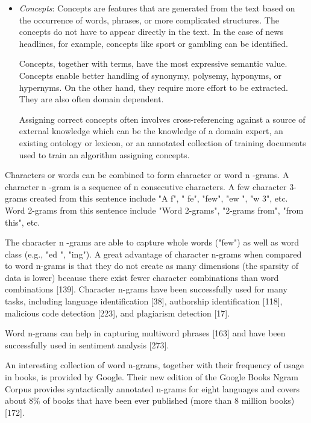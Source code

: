 \documentclass[11pt,openany,executivepaper]{book}
\begin{document}
\begin{itemize}
  Term extraction is related to the Named Entity Recognition (NER) problem, which is a subtask of Information Extraction. Its goal is to identify information units like names (typically persons, organizations, and location) and numeric expressions including time, date, money, and percent expressions [205].
  \bigskip
  
  \item \textit{Concepts}: Concepts are features that are generated from the text based on the occurrence of words, phrases, or more complicated structures. The concepts do not have to appear directly in the text. In the case of news headlines, for example, concepts like sport or gambling can be identified.
  \bigskip

  Concepts, together with terms, have the most expressive semantic value. Concepts enable better handling of synonymy, polysemy, hyponyms, or hypernyms. On the other hand, they require more effort to be extracted. They are also often domain dependent.
  \bigskip

  Assigning correct concepts often involves cross-referencing against a source of external knowledge which can be the knowledge of a domain expert, an existing ontology or lexicon, or an annotated collection of training documents used to train an algorithm assigning concepts.
\end{itemize}



Characters or words can be combined to form character or word n -grams. A character n -gram is a sequence of n consecutive characters. A few character 3-grams created from this sentence include "A f", " fe", "few", "ew ", "w 3", etc. Word 2-grams from this sentence include "Word 2-grams", "2-grams from", "from this", etc.

The character n -grams are able to capture whole words ("few") as well as word class (e.g., "ed ", "ing"). A great advantage of character n-grams when compared to word n-grams is that they do not create as many dimensions (the sparsity of data is lower) because there exist fewer character combinations than word combinations [139]. Character n-grams have been successfully used for many tasks, including language identification [38], authorship identification [118], malicious code detection [223], and plagiarism detection [17].

Word n-grams can help in capturing multiword phrases [163] and have been successfully used in sentiment analysis [273].

An interesting collection of word n-grams, together with their frequency of usage in books, is provided by Google. Their new edition of the Google Books Ngram Corpus provides syntactically annotated n-grams for eight languages and covers about $8 \%$ of books that have been ever published (more than 8 million books) [172].
\end{document}
